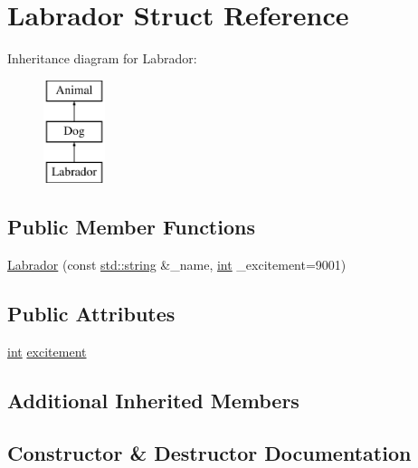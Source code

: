 \hypertarget{struct_labrador}{}\section{Labrador Struct Reference}
\label{struct_labrador}
Inheritance diagram for Labrador\+:\begin{figure}[H]
\begin{center}
\leavevmode
\includegraphics[height=3.000000cm]{struct_labrador}
\end{center}
\end{figure}
\subsection*{Public Member Functions}
\begin{DoxyCompactItemize}
\item 
\mbox{\hyperlink{struct_labrador_a1fc37f00872a6868a84c5a338419cdb9}{Labrador}} (const \mbox{\hyperlink{_s_d_l__opengl__glext_8h_ab4ccfaa8ab0e1afaae94dc96ef52dde1}{std\+::string}} \&\+\_\+name, \mbox{\hyperlink{warnings_8h_a74f207b5aa4ba51c3a2ad59b219a423b}{int}} \+\_\+excitement=9001)
\end{DoxyCompactItemize}
\subsection*{Public Attributes}
\begin{DoxyCompactItemize}
\item 
\mbox{\hyperlink{warnings_8h_a74f207b5aa4ba51c3a2ad59b219a423b}{int}} \mbox{\hyperlink{struct_labrador_aaf0ccc73c8a7ac5a378c739ddea893c7}{excitement}}
\end{DoxyCompactItemize}
\subsection*{Additional Inherited Members}


\subsection{Constructor \& Destructor Documentation}
\mbox{\label{struct_labrador_a1fc37f00872a6868a84c5a338419cdb9}} 
